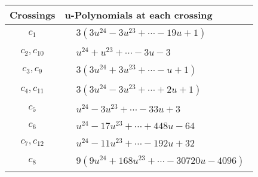 \documentclass[1p]{elsarticle_modified}
\theoremstyle{definition}
\begin{document}
\begin{tabular}{m{50pt}|m{274pt}}
Crossings & \hspace{64pt}u-Polynomials at each crossing \\
\hline $$\begin{aligned}c_{1}\end{aligned}$$&$\begin{aligned}
&3(3 u^{24}-3 u^{23}+\cdots-19 u+1)
\end{aligned}$\\
\hline $$\begin{aligned}c_{2},c_{10}\end{aligned}$$&$\begin{aligned}
&u^{24}+u^{23}+\cdots-3 u-3
\end{aligned}$\\
\hline $$\begin{aligned}c_{3},c_{9}\end{aligned}$$&$\begin{aligned}
&3(3 u^{24}+3 u^{23}+\cdots- u+1)
\end{aligned}$\\
\hline $$\begin{aligned}c_{4},c_{11}\end{aligned}$$&$\begin{aligned}
&3(3 u^{24}-3 u^{23}+\cdots+2 u+1)
\end{aligned}$\\
\hline $$\begin{aligned}c_{5}\end{aligned}$$&$\begin{aligned}
&u^{24}-3 u^{23}+\cdots-33 u+3
\end{aligned}$\\
\hline $$\begin{aligned}c_{6}\end{aligned}$$&$\begin{aligned}
&u^{24}-17 u^{23}+\cdots+448 u-64
\end{aligned}$\\
\hline $$\begin{aligned}c_{7},c_{12}\end{aligned}$$&$\begin{aligned}
&u^{24}-11 u^{23}+\cdots-192 u+32
\end{aligned}$\\
\hline $$\begin{aligned}c_{8}\end{aligned}$$&$\begin{aligned}
&9(9 u^{24}+168 u^{23}+\cdots-30720 u-4096)
\end{aligned}$\\
\hline
\end{tabular}\\~\\
\end{document}
